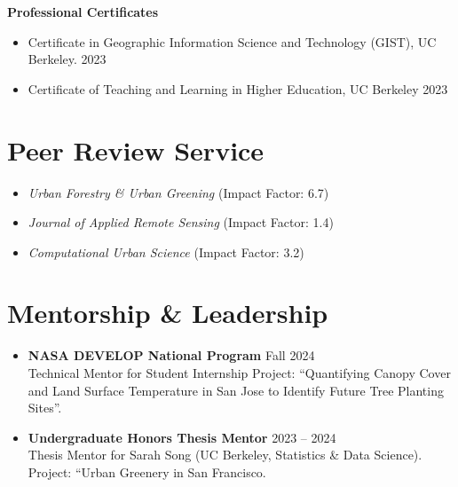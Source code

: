 \documentclass[a4paper,12pt]{article}
\begin{document}
\vspace{4pt}
\textbf{Professional Certificates}
\begin{itemize}[leftmargin=1.5em, itemsep=3pt, label=--]
    \item Certificate in Geographic Information Science and Technology (GIST), UC Berkeley.  \hfill 2023
    \item Certificate of Teaching and Learning in Higher Education, UC Berkeley \hfill 2023
\end{itemize}

\section{Peer Review Service}
\begin{itemize}[leftmargin=1.5em, itemsep=3pt, label=--]
    \item \textit{Urban Forestry \& Urban Greening} (Impact Factor: 6.7)
    \item \textit{Journal of Applied Remote Sensing} (Impact Factor: 1.4)
    \item \textit{Computational Urban Science} (Impact Factor: 3.2)
\end{itemize}

\section{Mentorship \& Leadership}
\begin{itemize}[leftmargin=1.5em, itemsep=6pt, label=--]
    \item \textbf{NASA DEVELOP National Program} \hfill Fall 2024
    \\ Technical Mentor for Student Internship Project: ``Quantifying Canopy Cover and Land Surface Temperature in San Jose to Identify Future Tree Planting Sites''.
    
    \item \textbf{Undergraduate Honors Thesis Mentor} \hfill 2023 -- 2024
    \\ Thesis Mentor for Sarah Song (UC Berkeley, Statistics \& Data Science). Project: ``Urban Greenery in San Francisco.
\end{itemize}
\end{document}
